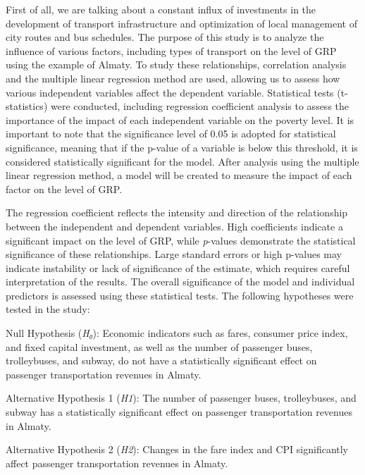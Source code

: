 \begin{multicols}{2}
First of all, we are talking about a constant influx of investments in
the development of transport infrastructure and optimization of local
management of city routes and bus schedules. The purpose of this study
is to analyze the influence of various factors, including types of
transport on the level of GRP using the example of Almaty. To study
these relationships, correlation analysis and the multiple linear
regression method are used, allowing us to assess how various
independent variables affect the dependent variable. Statistical tests
(t-statistics) were conducted, including regression coefficient analysis
to assess the importance of the impact of each independent variable on
the poverty level. It is important to note that the significance level
of 0.05 is adopted for statistical significance, meaning that if the
p-value of a variable is below this threshold, it is considered
statistically significant for the model. After analysis using the
multiple linear regression method, a model will be created to measure
the impact of each factor on the level of GRP.

The regression coefficient reflects the intensity and direction of the
relationship between the independent and dependent variables. High
coefficients indicate a significant impact on the level of GRP, while
\emph{p}-values \hspace{0pt}\hspace{0pt}demonstrate the statistical
significance of these relationships. Large standard errors or high
p-values \hspace{0pt}\hspace{0pt}may indicate instability or lack of
significance of the estimate, which requires careful interpretation of
the results. The overall significance of the model and individual
predictors is assessed using these statistical tests. The following
hypotheses were tested in the study:

Null Hypothesis (\emph{H₀}): Economic indicators such as fares, consumer
price index, and fixed capital investment, as well as the number of
passenger buses, trolleybuses, and subway, do not have a statistically
significant effect on passenger transportation revenues in Almaty.

Alternative Hypothesis 1 (\emph{H1}): The number of passenger buses,
trolleybuses, and subway has a statistically significant effect on
passenger transportation revenues in Almaty.

Alternative Hypothesis 2 (\emph{H2}): Changes in the fare index and CPI
significantly affect passenger transportation revenues in Almaty.


\end{multicols}
